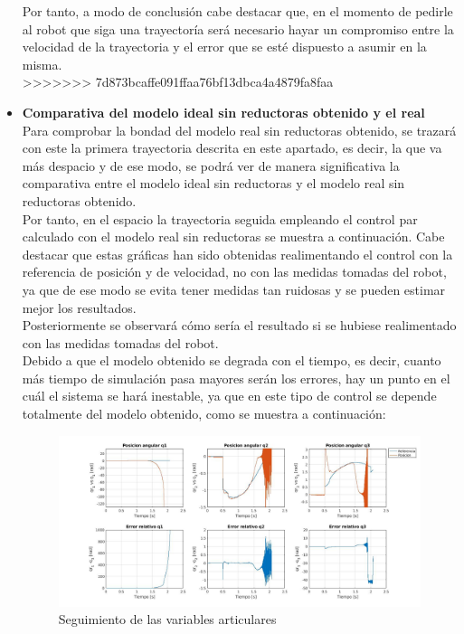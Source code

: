 \begin{itemize}
Por tanto, a modo de conclusión cabe destacar que, en el momento de pedirle al robot que siga una trayectoría será necesario hayar un compromiso entre la velocidad de la trayectoria y el error que se esté dispuesto a asumir en la misma.\\

\newpage
>>>>>>> 7d873bcaffe091ffaa76bf13dbca4a4879fa8faa
	\item \textbf{Comparativa del modelo ideal sin reductoras obtenido y el real} \\
	
	Para comprobar la bondad del modelo real sin reductoras obtenido, se trazará con este la primera trayectoria descrita en este apartado, es decir, la que va más despacio y de ese modo, se podrá ver de manera significativa la comparativa entre el modelo ideal sin reductoras y el modelo real sin reductoras obtenido. \\
	
	Por tanto, en el espacio la trayectoria seguida empleando el control par calculado con el modelo real sin reductoras se muestra a continuación. Cabe destacar que estas gráficas han sido obtenidas realimentando el control con la referencia de posición y de velocidad, no con las medidas tomadas del robot, ya que de ese modo se evita tener medidas tan ruidosas y se pueden estimar mejor los resultados.\\
	
	Posteriormente se observará cómo sería el resultado si se hubiese realimentado con las medidas tomadas del robot.\\
	
	
	
	Debido a que el modelo obtenido se degrada con el tiempo, es decir, cuanto más tiempo de simulación pasa mayores serán los errores, hay un punto en el cuál el sistema se hará inestable, ya que en este tipo de control se depende totalmente del modelo obtenido, como se muestra a continuación:
	
	
	
	\begin{figure}[h!]
		
		\centering
		
		\includegraphics[width=.8\textwidth]{exp4_posPDrealSR}
		
		\caption{Seguimiento de las variables articulares}
		
	\end{figure}
	
	
	
\end{itemize}